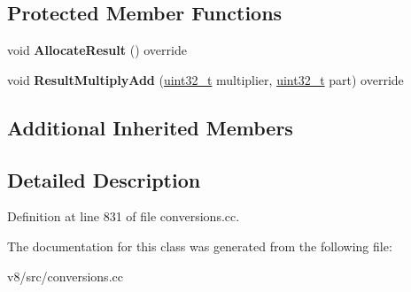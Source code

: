 \subsection*{Protected Member Functions}
\begin{DoxyCompactItemize}
\item 
\mbox{\label{classv8_1_1internal_1_1StringToBigIntHelper_a97c283cb9d5cbc74817aae54afc445cd}} 
void {\bfseries Allocate\+Result} () override
\item 
\mbox{\label{classv8_1_1internal_1_1StringToBigIntHelper_ab1e3298399adbc88cc9a16f016134d99}} 
void {\bfseries Result\+Multiply\+Add} (\mbox{\hyperlink{classuint32__t}{uint32\+\_\+t}} multiplier, \mbox{\hyperlink{classuint32__t}{uint32\+\_\+t}} part) override
\end{DoxyCompactItemize}
\subsection*{Additional Inherited Members}


\subsection{Detailed Description}


Definition at line 831 of file conversions.\+cc.



The documentation for this class was generated from the following file\+:\begin{DoxyCompactItemize}
\item 
v8/src/conversions.\+cc\end{DoxyCompactItemize}
